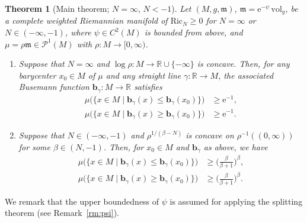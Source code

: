 \documentclass[sts]{imsart}
\newtheorem{theorem}{Theorem}[section]
\theoremstyle{definition}
\theoremstyle{remark}
\newcommand{\R}{\mathbb{R}}
\newcommand{\bb}{\mathbf{b}}
\newcommand{\fm}{\mathfrak{m}}
\newcommand{\lra}{\longrightarrow}
\newcommand{\e}{\mathrm{e}}
\newcommand{\Ric}{\mathrm{Ric}}
\begin{document}
\begin{theorem}[Main theorem; $N=\infty$, $N<-1$]\label{th:neg}
Let $(M,g,\fm)$, $\fm=\e^{-\psi} \,\mathrm{vol}_g$, be a complete weighted Riemannian manifold of $\Ric_N \ge 0$ for $N=\infty$ or $N \in (-\infty,-1)$, where $\psi \in C^2(M)$ is bounded from above,
and $\mu=\rho\fm \in \mathcal{P}^1(M)$ with $\rho \colon M \lra [0,\infty)$.

\begin{enumerate}[{\rm (i)}]
\item\label{main2_inf}
Suppose that $N=\infty$ and $\log\rho \colon M \lra \R \cup \{-\infty\}$ is concave.
Then, for any barycenter $x_0 \in M$ of $\mu$ and any straight line $\gamma\colon \R \lra M$,
the associated Busemann function $\bb_{\gamma}\colon M \lra \R$ satisfies
\begin{align}
\mu \bigl( \{ x \in M \mid \bb_{\gamma}(x) \le \bb_{\gamma}(x_0) \} \bigr) &\ge \e^{-1}, \label{eq:main2_inf}\\
\mu \bigl( \{ x \in M \mid \bb_{\gamma}(x) \ge \bb_{\gamma}(x_0) \} \bigr) &\ge \e^{-1}. \nonumber
\end{align}

\item\label{main2_neg}
Suppose that $N \in (-\infty,-1)$ and $\rho^{1/(\beta -N)}$ is concave on $\rho^{-1}((0,\infty))$ for some $\beta \in (N,-1)$.
Then, for $x_0 \in M$ and $\bb_{\gamma}$ as above, we have
\begin{align}
\mu \bigl( \{ x \in M \mid \bb_{\gamma}(x) \le \bb_{\gamma}(x_0) \} \bigr)
&\ge \biggl( \frac{\beta}{\beta +1} \biggr)^\beta, \label{eq:main2_neg}\\
\mu \bigl( \{ x \in M \mid \bb_{\gamma}(x) \ge \bb_{\gamma}(x_0) \} \bigr)
&\ge \biggl( \frac{\beta}{\beta +1} \biggr)^\beta. \nonumber
\end{align}
\end{enumerate}
\end{theorem}

We remark that the upper boundedness of $\psi$ is assumed for applying the splitting theorem (see Remark~\ref{rm:psi}).
\end{document}
